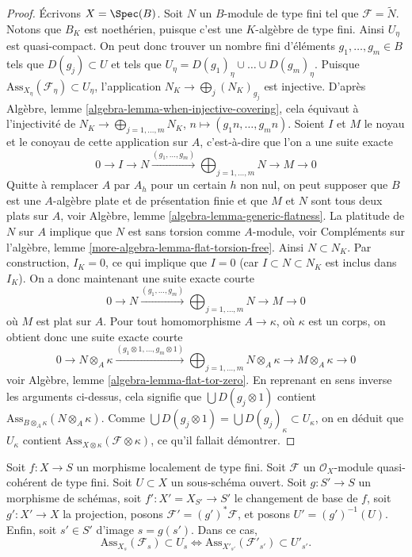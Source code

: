 \begin{proof}
\medskip\noindent
Écrivons $X = \Spec(B)$. Soit $N$ un $B$-module de type fini tel que
$\mathcal{F} = \widetilde{N}$.
Notons que $B_K$ est noethérien, puisque c'est une
$K$-algèbre de type fini. Ainsi $U_\eta$ est quasi-compact. On peut donc
trouver un nombre fini d'éléments $g_1, \ldots, g_m \in B$ tels que $D(g_j) \subset U$
et tels que $U_\eta = D(g_1)_\eta \cup \ldots \cup D(g_m)_\eta$.
Puisque $\text{Ass}_{X_\eta}(\mathcal{F}_\eta) \subset U_\eta$,
l'application $N_K \to \bigoplus_j (N_K)_{g_j}$ est injective. D'après
Algèbre, lemme \ref{algebra-lemma-when-injective-covering},
cela équivaut à l'injectivité de
$N_K \to \bigoplus\nolimits_{j = 1, \ldots, m} N_K$,
$n \mapsto (g_1n, \ldots, g_mn)$. Soient $I$ et $M$ le noyau et le
conoyau de cette application sur $A$, c'est-à-dire que l'on a une suite exacte
$$
0 \to I \to N \xrightarrow{(g_1, \ldots, g_m)}
\bigoplus\nolimits_{j = 1, \ldots, m} N \to M \to 0
$$
Quitte à remplacer $A$ par $A_h$ pour un certain $h$ non nul, on peut supposer que
$B$ est une $A$-algèbre plate et de présentation finie et que
$M$ et $N$ sont tous deux plats sur $A$, voir
Algèbre, lemme \ref{algebra-lemma-generic-flatness}.
La platitude de $N$ sur $A$ implique que $N$ est sans torsion comme
$A$-module, voir
Compléments sur l'algèbre, lemme \ref{more-algebra-lemma-flat-torsion-free}.
Ainsi $N \subset N_K$. Par construction, $I_K = 0$, ce qui implique que $I = 0$
(car $I \subset N \subset N_K$ est inclus dans $I_K$). On a donc maintenant
une suite exacte courte
$$
0 \to N \xrightarrow{(g_1, \ldots, g_m)}
\bigoplus\nolimits_{j = 1, \ldots, m} N \to M \to 0
$$
où $M$ est plat sur $A$. Pour tout homomorphisme $A \to \kappa$, où
$\kappa$ est un corps, on obtient donc une suite exacte courte
$$
0 \to N \otimes_A \kappa \xrightarrow{(g_1 \otimes 1, \ldots, g_m \otimes 1)}
\bigoplus\nolimits_{j = 1, \ldots, m} N \otimes_A \kappa \to
M \otimes_A \kappa \to 0
$$
voir
Algèbre, lemme \ref{algebra-lemma-flat-tor-zero}.
En reprenant en sens inverse les arguments ci-dessus,
cela signifie que $\bigcup D(g_j \otimes 1)$ contient
$\text{Ass}_{B \otimes_A \kappa}(N \otimes_A \kappa)$.
Comme $\bigcup D(g_j \otimes 1) = \bigcup D(g_j)_\kappa \subset U_\kappa$,
on en déduit que $U_\kappa$ contient
$\text{Ass}_{X \otimes \kappa}(\mathcal{F} \otimes \kappa)$,
ce qu'il fallait démontrer.
\end{proof}

\begin{lemma}
\label{lemma-base-change-assassin-in-U}
Soit $f : X \to S$ un morphisme localement de type fini.
Soit $\mathcal{F}$ un $\mathcal{O}_X$-module quasi-cohérent
de type fini. Soit $U \subset X$ un sous-schéma ouvert.
Soit $g : S' \to S$ un morphisme de schémas, soit
$f' : X' = X_{S'} \to S'$ le changement de base de $f$,
soit $g' : X' \to X$ la projection, posons
$\mathcal{F}' = (g')^*\mathcal{F}$, et posons
$U' = (g')^{-1}(U)$. Enfin, soit $s' \in S'$ d'image $s = g(s')$.
Dans ce cas,
$$
\text{Ass}_{X_s}(\mathcal{F}_s) \subset U_s
\Leftrightarrow
\text{Ass}_{X'_{s'}}(\mathcal{F}'_{s'}) \subset U'_{s'}.
$$
\end{lemma}

